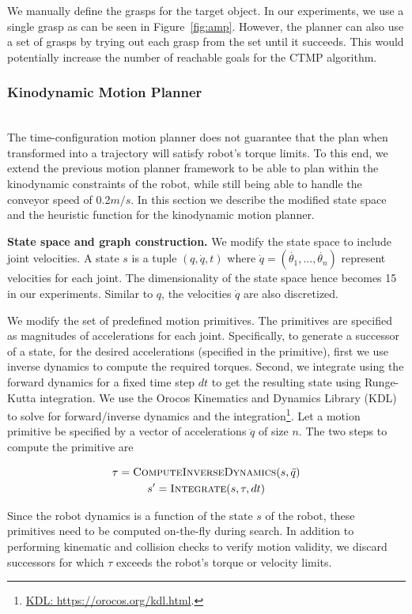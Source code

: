 \documentclass[a4paper]{report}
\begin{document}
We manually define the grasps for the target object. In our experiments, we use a single grasp as can be seen in Figure~\ref{fig:amp}. However, the planner can also use a set of grasps by trying out each grasp from the set until it succeeds. This would potentially increase the number of reachable goals for the CTMP algorithm.
\subsubsection{Kinodynamic Motion Planner}
\hfill\\
The time-configuration motion planner does not guarantee that the plan when transformed into a trajectory will satisfy robot's torque limits. To this end, we extend the previous motion planner framework to be able to plan within the kinodynamic constraints of the robot, while still being able to handle the conveyor speed of 0.2$m/s$. In this section we describe the modified state space and the heuristic function for the kinodynamic motion planner.

\textbf{State space and graph construction.}
We modify the state space to include joint velocities. A state $s$ is a tuple $(q,\dot{q},t)$ where $\dot{q} = (\dot{\theta_1},..., \dot{\theta_n})$ represent velocities for each joint. The dimensionality of the state space hence becomes 15 in our experiments. Similar to $q$, the velocities $\dot{q}$ are also discretized.

We modify the set of predefined motion primitives. The primitives are specified as magnitudes of accelerations for each joint. Specifically, to generate a successor of a state, for the desired accelerations (specified in the primitive), first we use inverse dynamics to compute the required torques. Second, we integrate using the forward dynamics for a fixed time step $dt$ to get the resulting state using Runge-Kutta integration. We use the Orocos Kinematics and Dynamics Library (KDL) to solve for forward/inverse dynamics and the integration\footnote{\url{KDL: https://orocos.org/kdl.html}.}.
Let a motion primitive be specified by a vector of accelerations $\ddot{q}$ of size $n$. The two steps to compute the primitive are

%
\begin{gather*}
\tau = \textsc{ComputeInverseDynamics}(s,\ddot{q}) \\
s' = \textsc{Integrate}(s, \tau, dt)
\end{gather*}
%

Since the robot dynamics is a function of the state $s$ of the robot, these primitives need to be computed on-the-fly during search. In addition to performing kinematic and collision checks to verify motion validity, we discard successors for which $\tau$ exceeds the robot's torque or velocity limits.
\end{document}
